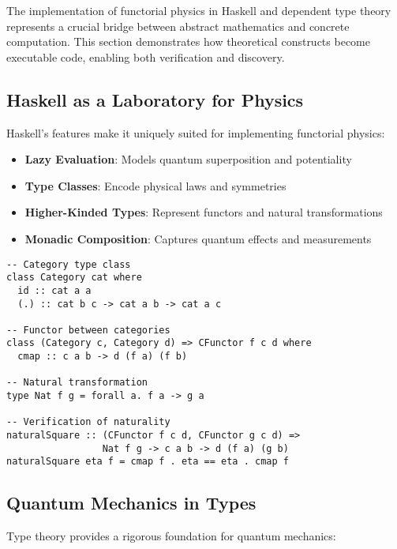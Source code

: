 The implementation of functorial physics in Haskell and dependent type theory represents a crucial bridge between abstract mathematics and concrete computation. This section demonstrates how theoretical constructs become executable code, enabling both verification and discovery.

\subsection{Haskell as a Laboratory for Physics}

Haskell's features make it uniquely suited for implementing functorial physics:

\begin{itemize}[leftmargin=*]
\item \textbf{Lazy Evaluation}: Models quantum superposition and potentiality
\item \textbf{Type Classes}: Encode physical laws and symmetries
\item \textbf{Higher-Kinded Types}: Represent functors and natural transformations
\item \textbf{Monadic Composition}: Captures quantum effects and measurements
\end{itemize}

\begin{example}
\begin{verbatim}
-- Category type class
class Category cat where
  id :: cat a a
  (.) :: cat b c -> cat a b -> cat a c
  
-- Functor between categories
class (Category c, Category d) => CFunctor f c d where
  cmap :: c a b -> d (f a) (f b)
  
-- Natural transformation
type Nat f g = forall a. f a -> g a

-- Verification of naturality
naturalSquare :: (CFunctor f c d, CFunctor g c d) =>
                 Nat f g -> c a b -> d (f a) (g b)
naturalSquare eta f = cmap f . eta == eta . cmap f
\end{verbatim}
\end{example}

\subsection{Quantum Mechanics in Types}

Type theory provides a rigorous foundation for quantum mechanics:

